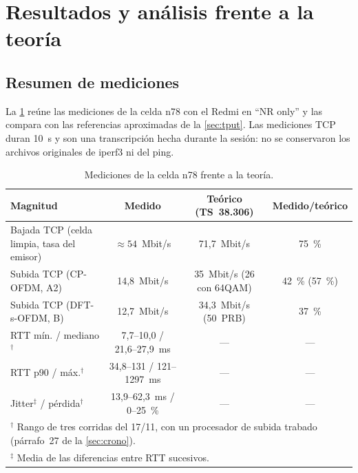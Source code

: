 \section{Resultados y análisis frente a la teoría}\label{sec:resultados}

\subsection{Resumen de mediciones}
La \cref{tab:resultados} reúne las mediciones de la celda n78 con el Redmi en ``NR only'' y las compara con las referencias aproximadas de la \cref{sec:tput}. Las mediciones TCP duran 10~s y son una transcripción hecha durante la sesión: no se conservaron los archivos originales de iperf3 ni del ping.

\begin{table}[htbp]
\centering
\caption{Mediciones de la celda n78 frente a la teoría.}
\label{tab:resultados}
\begin{tabular}{lccc}
\toprule
Magnitud & Medido & Teórico (TS~38.306) & Medido/teórico \\
\midrule
Bajada TCP (celda limpia, tasa del emisor) & $\approx 54$~Mbit/s & 71,7~Mbit/s & 75~\% \\
Subida TCP (CP-OFDM, A2) & 14,8~Mbit/s & 35~Mbit/s (26 con 64QAM) & 42~\% (57~\%) \\
Subida TCP (DFT-s-OFDM, B) & 12,7~Mbit/s & 34,3~Mbit/s (50~PRB) & 37~\% \\
RTT mín. / mediano$^\dagger$ & 7,7--10,0 / 21,6--27,9~ms & --- & --- \\
RTT p90 / máx.$^\dagger$ & 34,8--131 / 121--1297~ms & --- & --- \\
Jitter$^\ddagger$ / pérdida$^\dagger$ & 13,9--62,3~ms / 0--25~\% & --- & --- \\
\bottomrule
\multicolumn{4}{l}{\footnotesize $^\dagger$ Rango de tres corridas del 17/11, con un procesador de subida trabado (párrafo~27 de la \cref{sec:crono}).}\\
\multicolumn{4}{l}{\footnotesize $^\ddagger$ Media de las diferencias entre RTT sucesivos.}
\end{tabular}
\end{table}

